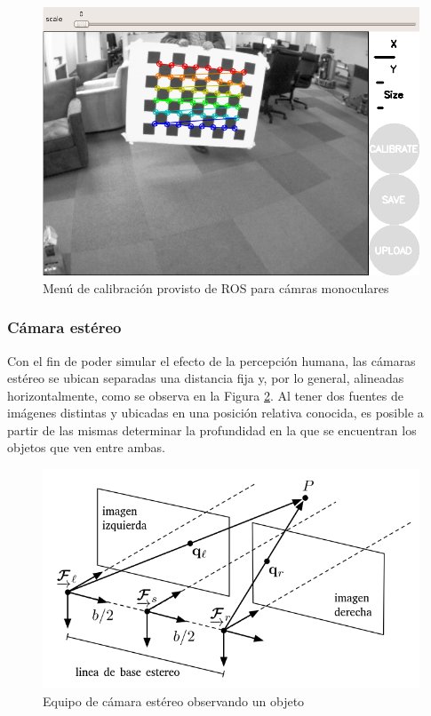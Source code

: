 \begin{figure}
    \centering
    \includegraphics[width=\linewidth]{Img/MonocularCameraCalibration.png}
    \caption{Menú de calibración provisto de ROS para cámras monoculares}
    \label{fig:monocularcameracalibration}
\end{figure}



\subsubsection{Cámara estéreo}
Con el fin de poder simular el efecto de la percepción humana, las cámaras estéreo se ubican separadas una distancia fija y, por lo general, alineadas horizontalmente, como se observa en la Figura \ref{fig:stereocamerarig}. Al tener dos fuentes de imágenes distintas y ubicadas en una posición relativa conocida, es posible a partir de las mismas determinar la profundidad en la que se encuentran los objetos que ven entre ambas. 
\begin{figure}[!ht]
    \centering
    \includegraphics[width=\linewidth]{Img/StereoCameraRig.png}
    \caption{Equipo de cámara estéreo observando un objeto}
    \label{fig:stereocamerarig}
\end{figure}

